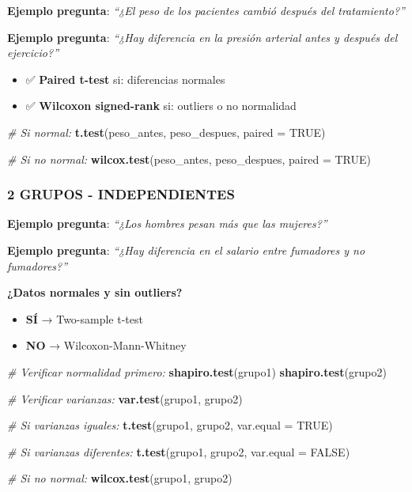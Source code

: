 \documentclass[
  10pt,
]{article}
\newenvironment{Shaded}{\begin{snugshade}}{\end{snugshade}}
\newcommand{\AttributeTok}[1]{\textcolor[rgb]{0.13,0.29,0.53}{#1}}
\newcommand{\CommentTok}[1]{\textcolor[rgb]{0.56,0.35,0.01}{\textit{#1}}}
\newcommand{\ConstantTok}[1]{\textcolor[rgb]{0.56,0.35,0.01}{#1}}
\newcommand{\FunctionTok}[1]{\textcolor[rgb]{0.13,0.29,0.53}{\textbf{#1}}}
\newcommand{\NormalTok}[1]{#1}
\providecommand{\tightlist}{%
  \setlength{\itemsep}{0pt}\setlength{\parskip}{0pt}}
\begin{document}
\textbf{Ejemplo pregunta}: \emph{``¿El peso de los pacientes cambió
después del tratamiento?''}

\textbf{Ejemplo pregunta}: \emph{``¿Hay diferencia en la presión
arterial antes y después del ejercicio?''}

\begin{itemize}
\tightlist
\item
  ✅ \textbf{Paired t-test} si: diferencias normales
\item
  ✅ \textbf{Wilcoxon signed-rank} si: outliers o no normalidad
\end{itemize}

\begin{Shaded}
\begin{Highlighting}[]
\CommentTok{\# Si normal:}
\FunctionTok{t.test}\NormalTok{(peso\_antes, peso\_despues, }\AttributeTok{paired =} \ConstantTok{TRUE}\NormalTok{)}

\CommentTok{\# Si no normal:}
\FunctionTok{wilcox.test}\NormalTok{(peso\_antes, peso\_despues, }\AttributeTok{paired =} \ConstantTok{TRUE}\NormalTok{)}
\end{Highlighting}
\end{Shaded}

\subsubsection{2 GRUPOS - INDEPENDIENTES}\label{grupos---independientes}

\textbf{Ejemplo pregunta}: \emph{``¿Los hombres pesan más que las
mujeres?''}

\textbf{Ejemplo pregunta}: \emph{``¿Hay diferencia en el salario entre
fumadores y no fumadores?''}

\textbf{¿Datos normales y sin outliers?}

\begin{itemize}
\tightlist
\item
  \textbf{SÍ} → Two-sample t-test
\item
  \textbf{NO} → Wilcoxon-Mann-Whitney
\end{itemize}

\begin{Shaded}
\begin{Highlighting}[]
\CommentTok{\# Verificar normalidad primero:}
\FunctionTok{shapiro.test}\NormalTok{(grupo1)}
\FunctionTok{shapiro.test}\NormalTok{(grupo2)}

\CommentTok{\# Verificar varianzas:}
\FunctionTok{var.test}\NormalTok{(grupo1, grupo2)}

\CommentTok{\# Si varianzas iguales:}
\FunctionTok{t.test}\NormalTok{(grupo1, grupo2, }\AttributeTok{var.equal =} \ConstantTok{TRUE}\NormalTok{)}

\CommentTok{\# Si varianzas diferentes:}
\FunctionTok{t.test}\NormalTok{(grupo1, grupo2, }\AttributeTok{var.equal =} \ConstantTok{FALSE}\NormalTok{)}

\CommentTok{\# Si no normal:}
\FunctionTok{wilcox.test}\NormalTok{(grupo1, grupo2)}
\end{Highlighting}
\end{Shaded}
\end{document}
